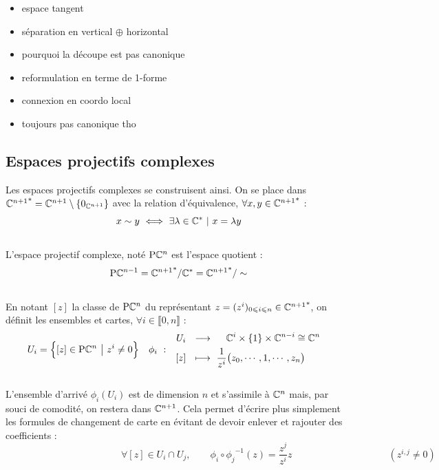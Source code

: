 \begin{itemize}
	\item espace tangent 
	
	\item séparation en vertical $\oplus$ horizontal
	
	\item pourquoi la découpe est pas canonique
	
	\item reformulation en terme de 1-forme
	
	\item connexion en coordo local
	
	\item toujours pas canonique tho
	
	
\end{itemize}





\subsection{Espaces projectifs complexes}

Les espaces projectifs complexes se construisent ainsi. On se place dans ${\mathbb{C}^{n+1}}^*=\mathbb{C}^{n+1}\setminus\{0_{\mathbb{C}^{n+1}}\}$ avec la relation d'équivalence, $\forall x,y\in{\mathbb{C}^{n+1}}^*$ :
\[x \sim y\ \Llr\ \exists \lambda\in\C^*\ |\ x=\lambda y\]
\\
L'espace projectif complexe, noté $\text{\normalfont P}\mathbb{C}^{n}$ est l'espace quotient :
\[\text{\normalfont P}\mathbb{C}^{n-1} = {\mathbb{C}^{n+1}}^*/\mathbb{C}^* = {\mathbb{C}^{n+1}}^*/\sim\]
\\
En notant $[z]$ la classe de $\text{\normalfont P}\mathbb{C}^{n}$ du représentant $z = (z^i)_{0\leqslant i\leqslant n}\in{\mathbb{C}^{n+1}}^*$, on définit les ensembles et cartes, $\forall i\in\llbracket0,n\rrbracket$ :
\begin{align}
	U_i &= \Big\{[z]\in\text{\normalfont P}\mathbb{C}^{n}\ \big|\ z^i\neq 0\Big\}  &  \phi_i\  :\quad &\begin{aligned}
		U_i\ \ &\longrightarrow\quad\ \mathbb{C}^{i}\times \{1\} \times\mathbb{C}^{n-i}\cong \mathbb{C}^{n} \\ [z]\ \ &\longmapsto\ \frac{1}{z^i}\big(z_0,\cdots, 1,\cdots, z_n\big)
	\end{aligned}
\end{align}
\\
L'ensemble d'arrivé $\phi_i(U_i)$ est de dimension $n$ et s'assimile à $\mathbb{C}^{n}$ mais, par souci de comodité, on restera dans $\mathbb{C}^{n+1}$. Cela permet  d'écrire plus simplement les formules de changement de carte en évitant de devoir enlever et rajouter des coefficients :
\[\qquad\qquad\qquad\qquad\qquad\qquad \forall [z]\in U_i\cap U_j,\qquad \phi_i \circ {\phi_j}^{-1}(z) = \frac{z^j}{z^i}z\qquad\qquad\qquad\qquad\qquad (z^{i,j}\neq 0) \qquad\]

